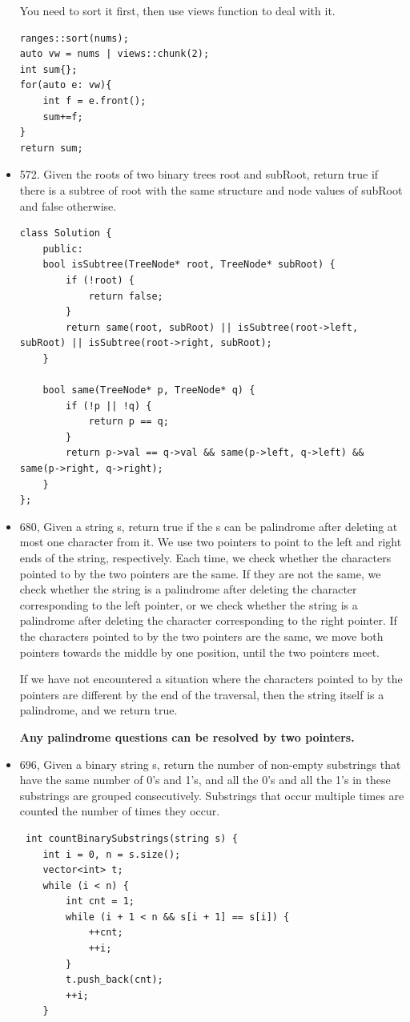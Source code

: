\documentclass[a4paper,11pt,twoside]{book}
\begin{document}
\begin{itemize}
	You need to sort it first, then use views function to deal with it.
\begin{lstlisting}
ranges::sort(nums);
auto vw = nums | views::chunk(2);
int sum{};
for(auto e: vw){
	int f = e.front();
	sum+=f;
}
return sum;
\end{lstlisting}

	
	\item 572. Given the roots of two binary trees root and subRoot, return true if there is a subtree of root with the same structure and node values of subRoot and false otherwise.
\begin{lstlisting}
class Solution {
	public:
	bool isSubtree(TreeNode* root, TreeNode* subRoot) {
		if (!root) {
			return false;
		}
		return same(root, subRoot) || isSubtree(root->left, subRoot) || isSubtree(root->right, subRoot);
	}
	
	bool same(TreeNode* p, TreeNode* q) {
		if (!p || !q) {
			return p == q;
		}
		return p->val == q->val && same(p->left, q->left) && same(p->right, q->right);
	}
};
\end{lstlisting}
	
	\item 680, Given a string s, return true if the s can be palindrome after deleting at most one character from it. We use two pointers to point to the left and right ends of the string, respectively. Each time, we check whether the characters pointed to by the two pointers are the same. If they are not the same, we check whether the string is a palindrome after deleting the character corresponding to the left pointer, or we check whether the string is a palindrome after deleting the character corresponding to the right pointer. If the characters pointed to by the two pointers are the same, we move both pointers towards the middle by one position, until the two pointers meet.
	
	If we have not encountered a situation where the characters pointed to by the pointers are different by the end of the traversal, then the string itself is a palindrome, and we return true.
	
	\textbf{Any palindrome questions can be resolved by two pointers.}
	
	\item 696, Given a binary string s, return the number of non-empty substrings that have the same number of 0's and 1's, and all the 0's and all the 1's in these substrings are grouped consecutively. Substrings that occur multiple times are counted the number of times they occur. 
\begin{lstlisting}
 int countBinarySubstrings(string s) {
	int i = 0, n = s.size();
	vector<int> t;
	while (i < n) {
		int cnt = 1;
		while (i + 1 < n && s[i + 1] == s[i]) {
			++cnt;
			++i;
		}
		t.push_back(cnt);
		++i;
	}
	

\end{lstlisting}
\end{itemize}
\end{document}
